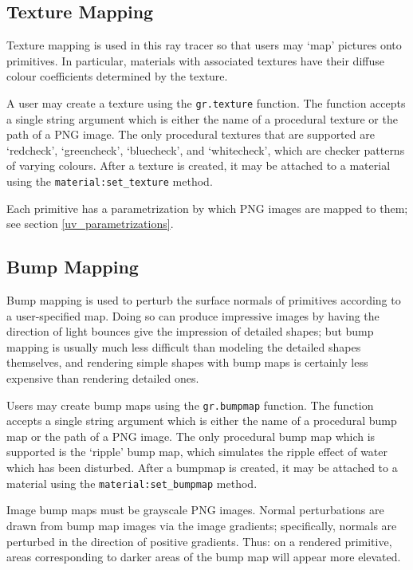 \documentclass{article}
\begin{document}
\subsection{Texture Mapping}
\label{texture_mapping}

Texture mapping is used in this ray tracer so that users may `map' pictures onto
primitives. In particular, materials with associated textures have their diffuse
colour coefficients determined by the texture.

A user may create a texture using the {\tt gr.texture} function. The function
accepts a single string argument which is either the name of a procedural
texture or the path of a PNG image. The only procedural textures that are
supported are `redcheck', `greencheck', `bluecheck', and `whitecheck', which are
checker patterns of varying colours. After a texture is created, it may be
attached to a material using the {\tt material:set\_texture} method.

Each primitive has a parametrization by which PNG images are mapped to them; see
section \ref{uv_parametrizations}.


\subsection{Bump Mapping}
\label{bump_mapping}

Bump mapping is used to perturb the surface normals of primitives according to a
user-specified map. Doing so can produce impressive images by having the
direction of light bounces give the impression of detailed shapes; but bump
mapping is usually much less difficult than modeling the detailed shapes
themselves, and rendering simple shapes with bump maps is certainly less
expensive than rendering detailed ones.

Users may create bump maps using the {\tt gr.bumpmap} function. The function accepts
a single string argument which is either the name of a procedural bump map or the
path of a PNG image. The only procedural bump map which is supported is the
`ripple' bump map, which simulates the ripple effect of water which has been
disturbed. After a bumpmap is created, it may be attached to a material using
the {\tt material:set\_bumpmap} method.

Image bump maps must be grayscale PNG images. Normal perturbations are drawn
from bump map images via the image gradients; specifically, normals are
perturbed in the direction of positive gradients. Thus: on a rendered primitive,
areas corresponding to darker areas of the bump map will appear more elevated.
\end{document}
